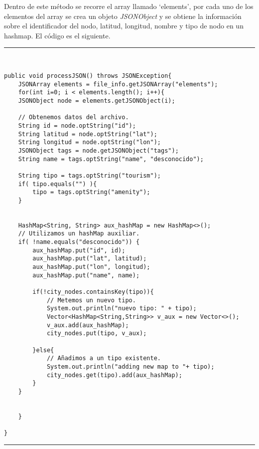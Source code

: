 Dentro de este método se recorre el array llamado \enquote*{elements}, por cada uno de los elementos del array se crea un objeto \textit{JSONObject} y se obtiene la información sobre el identificador del nodo, latitud, longitud, nombre y tipo de nodo en un hashmap. El código es el siguiente.\newline
\newpage
\noindent\rule[-1ex]{\textwidth}{1pt}\\
\begin{lstlisting}[caption=Función para procesar información sobre POIs y alojamientos.]
public void processJSON() throws JSONException{
	JSONArray elements = file_info.getJSONArray("elements");
	for(int i=0; i < elements.length(); i++){
	JSONObject node = elements.getJSONObject(i);
	
	// Obtenemos datos del archivo.
	String id = node.optString("id");
	String latitud = node.optString("lat");
	String longitud = node.optString("lon");
	JSONObject tags = node.getJSONObject("tags");
	String name = tags.optString("name", "desconocido");
	
	String tipo = tags.optString("tourism");
	if( tipo.equals("") ){
		tipo = tags.optString("amenity");
	}
	
	
	HashMap<String, String> aux_hashMap = new HashMap<>();
	// Utilizamos un hashMap auxiliar.
	if( !name.equals("desconocido")) {
		aux_hashMap.put("id", id);
		aux_hashMap.put("lat", latitud);
		aux_hashMap.put("lon", longitud);
		aux_hashMap.put("name", name);
		
		if(!city_nodes.containsKey(tipo)){
			// Metemos un nuevo tipo.
			System.out.println("nuevo tipo: " + tipo);
			Vector<HashMap<String,String>> v_aux = new Vector<>();
			v_aux.add(aux_hashMap);
			city_nodes.put(tipo, v_aux);
		
		}else{
			// Añadimos a un tipo existente.
			System.out.println("adding new map to "+ tipo);
			city_nodes.get(tipo).add(aux_hashMap);
		}
	}
	
	
	}

}
\end{lstlisting}
\noindent\rule[-1ex]{\textwidth}{1pt}\\

